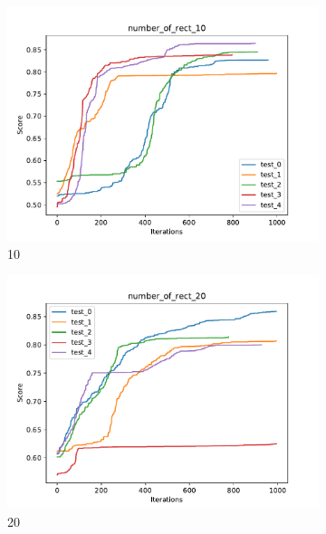 \begin{figure}[H]
    \centering 
    \begin{subfigure}[b]{0.49\linewidth}
        \includegraphics[width=\linewidth]{img/number_of_rect_10.pdf}
        \caption{10}
    \end{subfigure}
    \begin{subfigure}[b]{0.49\linewidth}
        \includegraphics[width=\linewidth]{img/number_of_rect_20.pdf}
        \caption{20}
    \end{subfigure}
    \begin{subfigure}[b]{0.49\linewidth}

\end{subfigure}
\end{figure}
